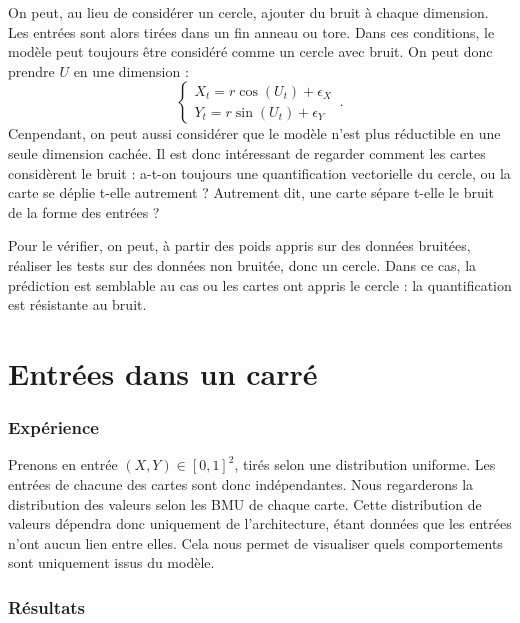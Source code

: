 On peut, au lieu de considérer un cercle, ajouter du bruit à chaque dimension. Les entrées sont alors tirées dans un fin anneau ou tore. Dans ces conditions, le modèle peut toujours être considéré comme un cercle avec bruit. On peut donc prendre $U$ en une dimension :  
$$
 \begin{cases}
     X_t = r  \cos(U_t) + \epsilon_X\\
     Y_t = r \sin(U_t) + \epsilon_Y
    \end{cases}\,.
$$
Cenpendant, on peut aussi considérer que le modèle n'est plus réductible en une seule dimension cachée.
Il est donc intéressant de regarder comment les cartes considèrent le bruit : a-t-on toujours une quantification vectorielle du cercle, ou la carte se déplie t-elle autrement ? Autrement dit, une carte sépare t-elle le bruit de la forme des entrées ?

Pour le vérifier, on peut, à partir des poids appris sur des données bruitées, réaliser les tests sur des données non bruitée, donc un cercle. 
Dans ce cas, la prédiction est semblable au cas ou les cartes ont appris le cercle : la quantification est résistante au bruit.

\section{Entrées dans un carré}

\subsubsection{Expérience}
Prenons en entrée $(X,Y) \in [0,1]^2$, tirés selon une distribution uniforme. Les entrées de chacune des cartes sont donc indépendantes. Nous regarderons la distribution des valeurs selon les BMU de chaque carte. Cette distribution de valeurs dépendra donc uniquement de l'architecture, étant données que les entrées n'ont aucun lien entre elles. Cela nous permet de visualiser quels comportements sont uniquement issus du modèle.
 
\subsubsection{Résultats}


